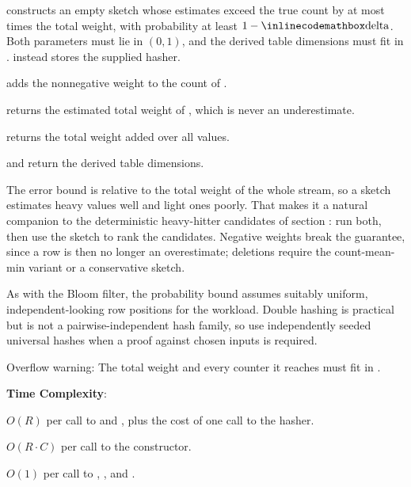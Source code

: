 \begin{compactitem}
  \item {} constructs an empty sketch whose estimates exceed the true count by at most  times the total weight, with probability at least $1 - {\inlinecodemath{delta}}$. Both parameters must lie in $(0, 1)$, and the derived table dimensions must fit in .  instead stores the supplied hasher.
  \item {} adds the nonnegative weight  to the count of .
  \item {} returns the estimated total weight of , which is never an underestimate.
  \item {} returns the total weight added over all values.
  \item {} and  return the derived table dimensions.
\end{compactitem}

The error bound is relative to the total weight of the whole stream, so a sketch estimates heavy values well and light ones poorly. That makes it a natural companion to the deterministic heavy-hitter candidates of section : run both, then use the sketch to rank the candidates. Negative weights break the guarantee, since a row is then no longer an overestimate; deletions require the count-mean-min variant or a conservative sketch.

As with the Bloom filter, the probability bound assumes suitably uniform, independent-looking row positions for the workload. Double hashing is practical but is not a pairwise-independent hash family, so use independently seeded universal hashes when a proof against chosen inputs is required.

Overflow warning: The total weight and every counter it reaches must fit in .

\textbf{Time Complexity}:
\begin{compactitem}
  \item $O(R)$ per call to  and , plus the cost of one call to the hasher.
  \item $O(R \cdot C)$ per call to the constructor.
  \item $O(1)$ per call to , , and .
\end{compactitem}

